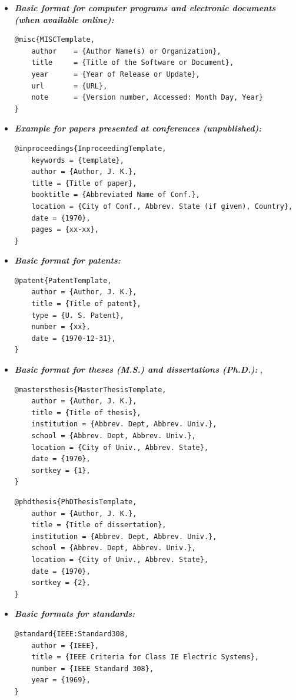 \begin{itemize}
  \item \textit{\textbf{Basic format for computer programs and electronic documents (when available online):}} \cite{MISCTemplate}
  \begin{lstlisting}[language=TeX]
@misc{MISCTemplate,
    author    = {Author Name(s) or Organization},
    title     = {Title of the Software or Document},
    year      = {Year of Release or Update},
    url       = {URL},
    note      = {Version number, Accessed: Month Day, Year}
}
  \end{lstlisting}

\newpage
  \item \textit{\textbf{Example for papers presented at conferences (unpublished):}} \cite{InproceedingTemplate}
  \begin{lstlisting}[language=TeX]
@inproceedings{InproceedingTemplate,
    keywords = {template},
    author = {Author, J. K.},
    title = {Title of paper},
    booktitle = {Abbreviated Name of Conf.},
    location = {City of Conf., Abbrev. State (if given), Country},
    date = {1970},
    pages = {xx-xx},
}
  \end{lstlisting}

  \item \textit{\textbf{Basic format for patents:}} \cite{PatentTemplate}
  \begin{lstlisting}[language=TeX]
@patent{PatentTemplate,
    author = {Author, J. K.},
    title = {Title of patent},
    type = {U. S. Patent},
    number = {xx},
    date = {1970-12-31},
}
  \end{lstlisting}

  \item \textit{\textbf{Basic format for theses (M.S.) and dissertations (Ph.D.):}} \cite{MasterThesisTemplate}, \cite{PhDThesisTemplate}
  \begin{lstlisting}[language=TeX]
@mastersthesis{MasterThesisTemplate,
    author = {Author, J. K.},
    title = {Title of thesis},
    institution = {Abbrev. Dept, Abbrev. Univ.},
    school = {Abbrev. Dept, Abbrev. Univ.},
    location = {City of Univ., Abbrev. State},
    date = {1970},
    sortkey = {1},
}
  \end{lstlisting}

  \begin{lstlisting}[language=TeX]
@phdthesis{PhDThesisTemplate,
    author = {Author, J. K.},
    title = {Title of dissertation},
    institution = {Abbrev. Dept, Abbrev. Univ.},
    school = {Abbrev. Dept, Abbrev. Univ.},
    location = {City of Univ., Abbrev. State},
    date = {1970},
    sortkey = {2},
}
  \end{lstlisting}

  \item \textit{\textbf{Basic formats for standards:}} \cite{IEEE:Standard308}
  \begin{lstlisting}[language=TeX]
@standard{IEEE:Standard308,
    author = {IEEE},
    title = {IEEE Criteria for Class IE Electric Systems},
    number = {IEEE Standard 308},
    year = {1969},
}
  \end{lstlisting}

\end{itemize}
